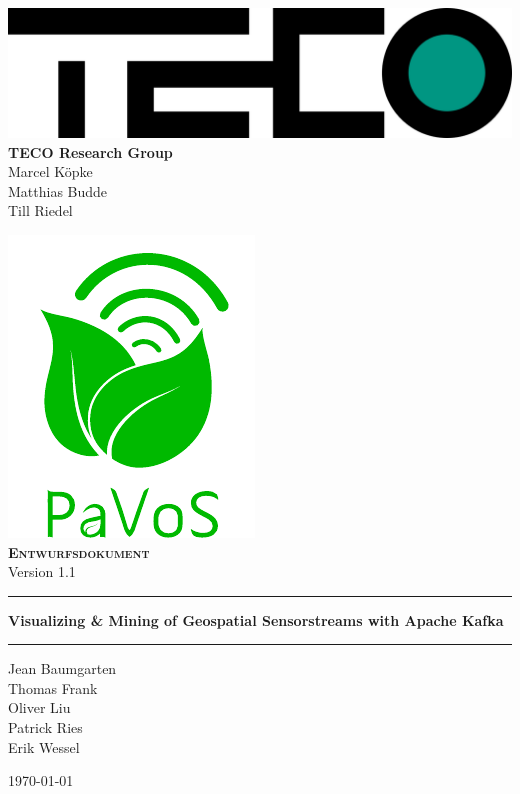 \begin{titlepage}
	\begin{center}
	\includegraphics[width=0.4\linewidth]{images/TECOLogo.png}\\[0.2cm]

	\textbf{TECO Research Group}\\[0.2cm]
	Marcel Köpke\\Matthias Budde\\Till Riedel\\
	\vspace{1cm}
	
	\includegraphics[width=0.25\linewidth]{images/PaVoSLogo-Erweitert}\\[1cm]
	
	\textsc{\textbf{\LARGE Entwurfsdokument}}\\
	{\small Version 1.1}\\
	
	\vspace{1cm}\hrule\vspace{0.4cm}
	\textbf{\huge Visualizing \& Mining of Geospatial Sensorstreams with Apache Kafka}\\
	\vspace{0.4cm}\hrule\vspace{1cm}
	
	{\Large Jean Baumgarten\\
	Thomas Frank\\
	Oliver Liu\\
	Patrick Ries\\
	Erik Wessel\\}

	\vspace{1cm}
	\today
	
	\end{center}
\end{titlepage}